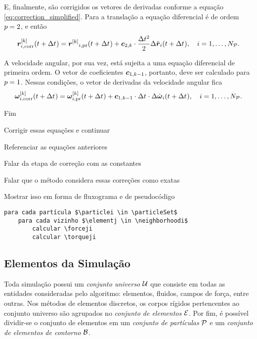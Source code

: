E, finalmente, são corrigidos os vetores de derivadas conforme a equação \eqref{eq:correction_simplified}. Para a translação a equação diferencial é de ordem \(\eqOrder = 2\), e então
\begin{equation*}
	\drvec{\taylorOrder}{\positionicorr}\pqty{t+\Dt} = \drvecipr{\taylorOrder}{\position}\pqty{t+\Dt} + \correctorConstantVector{\taylorOrder}{2}\cdot\dfrac{\Dt^2}{2}\Delta \accelerationi\pqty{t+\Dt}, \quad i = 1, \dotsc, \numberOfParticles.
\end{equation*}

A velocidade angular, por sua vez, está sujeita a uma equação diferencial de primeira ordem. O vetor de coeficientes \(\correctorConstantVector{\taylorOrder-1}{1}\), portanto, deve ser calculado para \(\eqOrder=1\). Nessas condições, o vetor de derivadas da velocidade angular fica
\begin{equation*}
		\drvec{\taylorOrder}{\angularVelocityicorr}\pqty{t+\Dt} = \drvec{\taylorOrder}{\angularVelocityipr}\pqty{t+\Dt} + \correctorConstantVector{\taylorOrder-1}{1}\cdot\Dt\cdot\Delta \dangularVelocityi{1}\pqty{t+\Dt}, \quad i = 1, \dotsc, \numberOfParticles.
\end{equation*}

\alert{Fim}



\alert{Corrigir essas equações e continuar}

\alert{Referenciar as equações anteriores}

\alert{Falar da etapa de correção com as constantes}

\alert{Falar que o método considera essas correções como exatas}

\alert{Mostrar isso em forma de fluxograma e de pseudocódigo}

\begin{lstlisting}[style=pseudocode]
para cada partícula $\particlei \in \particleSet$
	para cada vizinho $\elementj \in \neighborhoodi$
		calcular \forceji
		calcular \torqueji
\end{lstlisting}

\subsection{Elementos da Simulação}

Toda simulação possui um \textit{conjunto universo} \(\universeSet\) que consiste em todas as entidades consideradas pelo algoritmo: elementos, fluidos, campos de força, entre outras. Nos métodos de elementos discretos, os corpos rígidos pertencentes ao conjunto universo são agrupados no \textit{conjunto de elementos} \(\elementSet\). Por fim, é possível dividir-se o conjunto de elementos em um \textit{conjunto de partículas} \(\particleSet\) e um \textit{conjunto de elementos de contorno} \(\boundarySet\).

